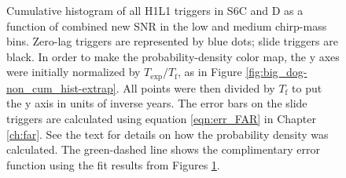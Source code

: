 \begin{figure}[p]
\center
{}
\caption{Cumulative histogram of all H1L1 triggers in S6C and D as a function
of combined new \ac{SNR} in the low and medium chirp-mass bins. Zero-lag
triggers are represented by blue dots; slide triggers are black. In order to
make the probability-density color map, the y axes were initially normalized by
$T_{\mathrm{exp}}/T_{\mathrm{f}}$, as in Figure
\ref{fig:big_dog-non_cum_hist-extrap}. All points were then divided by
$T_{\mathrm{f}}$ to put the y axis in units of inverse years. The error bars on
the slide triggers are calculated using equation \ref{eqn:err_FAR} in Chapter
\ref{ch:far}. See the text for details on how the probability density was
calculated. The green-dashed line shows the complimentary error function using
the fit results from Figures \ref{fig:big_dog-cum_hist-extrap}.}
\label{fig:big_dog-cum_hist-extrap}
\end{figure}

